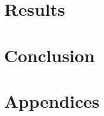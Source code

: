 \documentclass[11pt]{memoir} %
\begin{document}
\chapter[Results]{Results}




%



%



\chapter[Conclusion][Conclusion]{Conclusion}




\backmatter

 



\appendix 
{}

\chapter[Appendices][Appendices]{Appendices}

	
\end{document}
